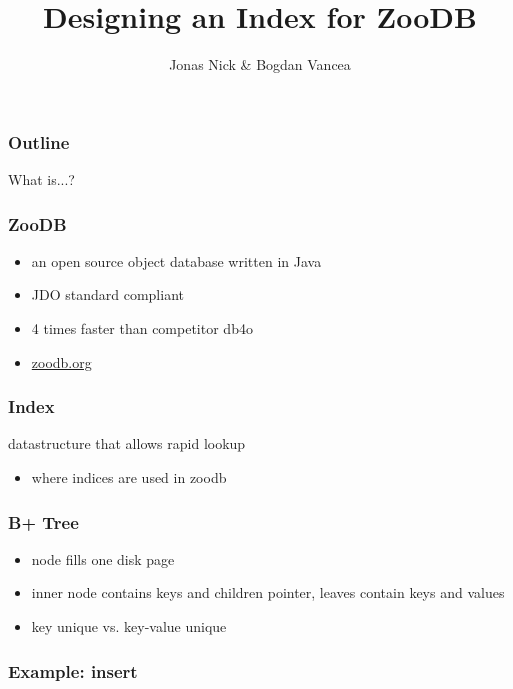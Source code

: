 \documentclass{beamer}
\title{Designing an Index for ZooDB}
\author{Jonas Nick \& Bogdan Vancea}
\begin{document}
  \frame{\titlepage}
  \begin{frame}
    \frametitle{Outline}
    \tableofcontents[hideallsubsections]
  \end{frame}

  \begin{section}{What is...?}
    \begin{frame}
      \frametitle{ZooDB}
      \begin{itemize}
        \item an open source object database written in Java
        \item JDO standard compliant
        \item 4 times faster than competitor db4o
        \item \url{zoodb.org}
      \end{itemize}

    \end{frame}
    \begin{frame}
      \frametitle{Index}
      \begin{block}{}
        datastructure that allows rapid lookup
      \end{block}
      \begin{itemize}
        \item where indices are used in zoodb
      \end{itemize}
    \end{frame}
    \begin{frame}
      \frametitle{B+ Tree}
      \begin{itemize}
        \item node fills one disk page
        \item inner node contains keys and children pointer, leaves contain keys and values
        \item key unique vs. key-value unique
      \end{itemize}
    \end{frame}
    \begin{frame}
      \frametitle{Example: insert}
    \end{frame}
  \end{section}
\end{document}

